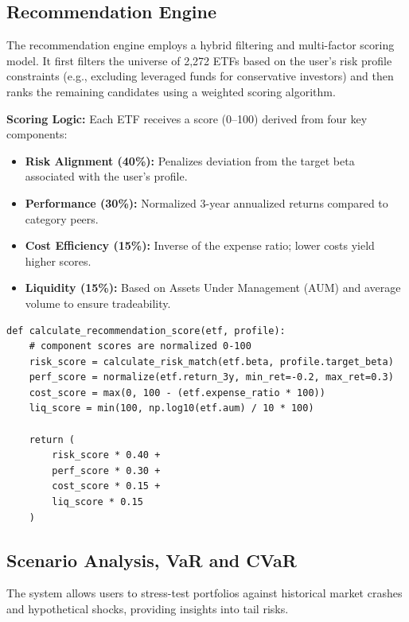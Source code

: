 \subsection{Recommendation Engine}

The recommendation engine employs a hybrid filtering and multi-factor scoring model. It first filters the universe of 2,272 ETFs based on the user's risk profile constraints (e.g., excluding leveraged funds for conservative investors) and then ranks the remaining candidates using a weighted scoring algorithm.

\textbf{Scoring Logic:}
Each ETF receives a score (0--100) derived from four key components:
\begin{itemize}
    \item \textbf{Risk Alignment (40\%):} Penalizes deviation from the target beta associated with the user's profile.
    \item \textbf{Performance (30\%):} Normalized 3-year annualized returns compared to category peers.
    \item \textbf{Cost Efficiency (15\%):} Inverse of the expense ratio; lower costs yield higher scores.
    \item \textbf{Liquidity (15\%):} Based on Assets Under Management (AUM) and average volume to ensure tradeability.
\end{itemize}

\begin{lstlisting}[style=pythonstyle, caption={ETF Recommendation Scoring}]
def calculate_recommendation_score(etf, profile):
    # component scores are normalized 0-100
    risk_score = calculate_risk_match(etf.beta, profile.target_beta)
    perf_score = normalize(etf.return_3y, min_ret=-0.2, max_ret=0.3)
    cost_score = max(0, 100 - (etf.expense_ratio * 100)) 
    liq_score = min(100, np.log10(etf.aum) / 10 * 100)
    
    return (
        risk_score * 0.40 +
        perf_score * 0.30 +
        cost_score * 0.15 +
        liq_score * 0.15
    )
\end{lstlisting}

\subsection{Scenario Analysis, VaR and CVaR}

The system allows users to stress-test portfolios against historical market crashes and hypothetical shocks, providing insights into tail risks.

